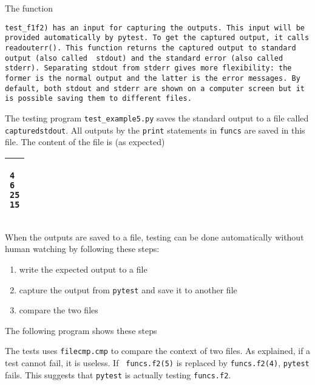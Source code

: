 The function {\tt test\_f1f2) has an input for capturing the outputs.
  This input will be provided automatically by {\tt pytest}.  To get
  the captured output, it calls {\tt readouterr()}.  This function
  returns the captured output to standard output (also called {\tt
    stdout}) and the standard error (also called {\tt stderr}).
  Separating {\tt stdout} from {\tt stderr} gives more flexibility:
  the former is the normal output and the latter is the error
  messages.  By default, both {\tt stdout} and {\tt stderr} are shown
  on a computer screen but it is possible saving them to different
  files.

  The testing program {\tt test\_example5.py} saves the standard
  output to a file called {\tt capturedstdout}. All outputs by the
  {\tt print} statements in {\tt funcs} are saved in this file.
  The content of the file is (as expected)

 
\vspace{0.2in}

\noindent
\begin{tabular}{|p{5in}|}\hline
\begin{verbatim}
4
6
25
15
\end{verbatim}
\\ \hline
\end{tabular}
\vspace{0.2in}

When the outputs are saved to a file, testing can be done automatically
without human watching by following these steps:

\begin{enumerate}
\item write the expected output to a file
\item capture the output from {\tt pytest} and save it to another file
\item compare the two files
\end{enumerate}

The following program shows these steps

\resetlinenumber[1]
\linenumbers
\begin{tt}
  
\end{tt}
\nolinenumbers

The tests uses {\tt filecmp.cmp} to compare the context of two files.
As explained, if a test cannot fail, it is useless. If {\tt
  funcs.f2(5)} is replaced by {\tt funcs.f2(4)}, {\tt pytest} fails.
This suggests that {\tt pytest} is actually testing {\tt funcs.f2}.

}
